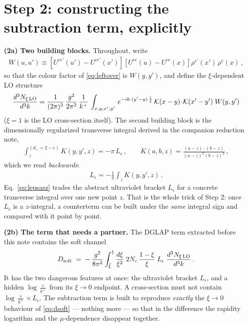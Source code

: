 \documentclass[10pt]{article}
\newcommand{\Leps}{L_{\epsilon}}
\newcommand{\KK}{\mathcal K(x-y)\!\cdot\!\mathcal K(x'-y')}
\begin{document}
\section{Step 2: constructing the subtraction term, explicitly}

\textbf{(2a) Two building blocks.} Throughout, write
\begin{align}
W(u,u')\equiv\left[U^{ce'}(u')-U^{ce'}(x')\right]\left[U^{ce}(u)-U^{ce}(x)\right]\rho^{e'}(x')\,\rho^{e}(x)\,,
\end{align}
so that the colour factor of \eqref{eq:leftover} is $W(y,y')$, and define the $\xi$-dependent
LO structure
\begin{align}\label{eq:dnxilo}
\frac{d^{3}N_{\xi\,\rm LO}}{d^{3}k} = \frac{1}{(2\pi)^{3}}\, \frac{g^{2}}{2\pi^{2}}\, \frac{1}{k^{+}}\,\int_{x,y,x',y'}\, e^{-ik\cdot (y'-y)\,\frac{1}{\xi}}\, \KK\;W(y,y')
\end{align}
($\xi=1$ is the LO cross-section itself). The second building block is the dimensionally
regularized transverse integral derived in the companion reduction note,
\begin{align}\label{eq:zint}
\int_{z}^{(d_{\perp}=2-\epsilon)} K(y,y',z)=-\pi\,\Leps\,,\qquad
K(a,b,z)=\frac{(a-z)\cdot(b-z)}{(a-z)^{2}(b-z)^{2}}\,,
\end{align}
which we read \emph{backwards}:
\begin{align}\label{eq:lepsasz}
\Leps=-\frac{1}{\pi}\int_{z}K(y,y',z)\,.
\end{align}
Eq.~\eqref{eq:lepsasz} trades the abstract ultraviolet bracket $\Leps$ for a concrete
transverse integral over one new point $z$. That is the whole trick of Step 2: once $\Leps$ is
a $z$-integral, a counterterm can be built under the \emph{same} integral sign and compared
with it point by point.

\textbf{(2b) The term that needs a partner.} The DGLAP term extracted before this note contains
the soft channel
\begin{align}\label{eq:dsoft}
D_{\rm soft}\;=\;-\,\frac{g^{2}}{8\pi^{2}}\int_{\bar\xi}^{1}\frac{d\xi}{\xi^{2}}\;2N_{c}\,\frac{1-\xi}{\xi}\;\Leps\;\frac{d^{3}N_{\xi\,\rm LO}}{d^{3}k}\,.
\end{align}
It has the two dangerous features at once: the ultraviolet bracket $\Leps$, and a hidden
$\log\frac{\vee}{k^{+}}$ from its $\xi\to0$ endpoint. A cross-section must not contain
$\log\frac{\vee}{k^{+}}\times\Leps$. The subtraction term is built to reproduce \emph{exactly}
the $\xi\to0$ behaviour of \eqref{eq:dsoft} --- nothing more --- so that in the difference the
rapidity logarithm and the $\mu$-dependence disappear together.
\end{document}
